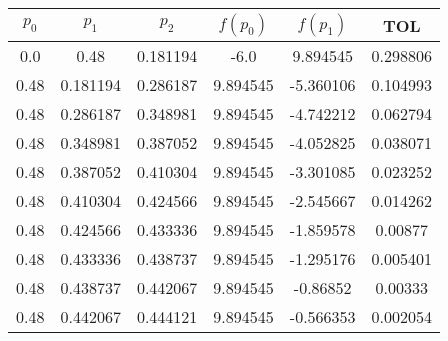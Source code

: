 \documentclass[12pt]{article}
\begin{document}
\begin{enumerate}
\begin{enumerate}
            \begin{center}
            \begin{tabular}{|c|c|c|c|c|c|}
            \hline
            \(p_0\) & \(p_1\)& \(p_2\)&\(f(p_0)\) & \(f(p_1)\) & \textbf{TOL} \\
            \hline
            0.0 & 0.48 & 0.181194 & -6.0 & 9.894545 &  0.298806 \\
            0.48 & 0.181194 & 0.286187 & 9.894545 & -5.360106 &  0.104993 \\
            0.48 & 0.286187 & 0.348981 & 9.894545 & -4.742212 &  0.062794 \\
            0.48 & 0.348981 & 0.387052 & 9.894545 & -4.052825 &  0.038071 \\
            0.48 & 0.387052 & 0.410304 & 9.894545 & -3.301085 &  0.023252 \\
            0.48 & 0.410304 & 0.424566 & 9.894545 & -2.545667 &  0.014262 \\
            0.48 & 0.424566 & 0.433336 & 9.894545 & -1.859578 &  0.00877 \\
            0.48 & 0.433336 & 0.438737 & 9.894545 & -1.295176 &  0.005401 \\
            0.48 & 0.438737 & 0.442067 & 9.894545 & -0.86852 &  0.00333 \\
            0.48 & 0.442067 & 0.444121 & 9.894545 & -0.566353 &  0.002054 \\
            \hline 
            \end{tabular}
            \end{center}


\end{enumerate}
\end{enumerate}
\end{document}
